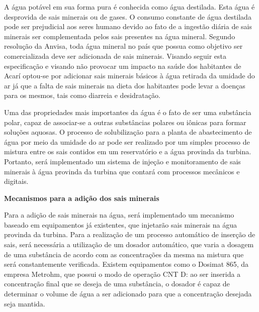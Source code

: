 
A água potável em sua forma pura é conhecida como água destilada. Esta água é desprovida de sais minerais ou de gases.
O consumo constante de água destilada pode ser prejudicial aos seres humano devido ao fato de a ingestão diária de sais
minerais ser complementada pelos sais presentes na água mineral. Segundo resolução da Anvisa, toda água mineral no país 
que possua como objetivo ser comercializada deve ser adicionada de sais minerais. Visando seguir esta especificação e
visando não provocar um impacto na saúde dos habitantes de Acarí optou-se por adicionar sais minerais básicos à água
retirada da umidade do ar já que a falta de sais minerais na dieta dos habitantes pode levar a doenças para os mesmos,
tais como diarreia e desidratação.

Uma das propriedades mais importantes da água é o fato de ser uma substância polar, capaz de associar-se a outras substâncias 
polares ou iônicas para formar soluções aquosas. O processo de solubilização para a planta de abastecimento de água por meio
da umidade do ar pode ser realizado por um simples processo de mistura entre os sais contidos em um reservatório e a água
provinda da turbina. Portanto, será implementado um sistema de injeção e monitoramento de sais minerais à água provinda da
turbina que contará com processos mecânicos e digitais.

\begin{center}
\textbf{Mecanismos para a adição dos sais minerais}
\end{center}

  Para a adição de sais minerais na água, será implementado um mecanismo baseado em equipamentos já existentes, que injetarão
  sais minerais na água provinda da turbina. Para a realização de um processo automático de inserção de sais, será necessária 
  a utilização de um dosador automático, que varia a dosagem de uma substância de acordo com as concentrações da mesma na mistura 
  que será constantemente verificada. Existem equipamentos como o Dosimat 865, da empresa Metrohm, que possui o modo de operação
  CNT D: ao ser inserida a concentração final que se deseja de uma substância, o dosador é capaz de determinar o volume de água
  a ser adicionado para que a concentração desejada seja mantida.
  
